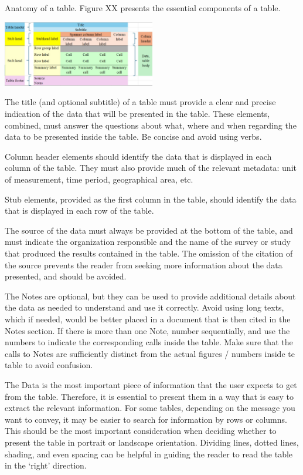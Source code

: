 \documentclass[
  12pt,
]{book}
\begin{document}
Anatomy of a table. Figure XX presents the essential components of a table.

\includegraphics[width=0.5\textwidth,height=\textheight]{pics/Table1.jpg}

The title (and optional subtitle) of a table must provide a clear and precise indication of the data that will be presented in the table. These elements, combined, must answer the questions about what, where and when regarding the data to be presented inside the table. Be concise and avoid using verbs.

Column header elements should identify the data that is displayed in each column of the table. They must also provide much of the relevant metadata: unit of measurement, time period, geographical area, etc.

Stub elements, provided as the first column in the table, should identify the data that is displayed in each row of the table.

The source of the data must always be provided at the bottom of the table, and must indicate the organization responsible and the name of the survey or study that produced the results contained in the table. The omission of the citation of the source prevents the reader from seeking more information about the data presented, and should be avoided.

The Notes are optional, but they can be used to provide additional details about the data as needed to understand and use it correctly. Avoid using long texts, which if needed, would be better placed in a document that is then cited in the Notes section. If there is more than one Note, number sequentially, and use the numbers to indicate the corresponding calls inside the table. Make sure that the calls to Notes are sufficiently distinct from the actual figures / numbers inside te table to avoid confusion.

The Data is the most important piece of information that the user expects to get from the table. Therefore, it is essential to present them in a way that is easy to extract the relevant information. For some tables, depending on the message you want to convey, it may be easier to search for information by rows or columns. This should be the most important consideration when deciding whether to present the table in portrait or landscape orientation. Dividing lines, dotted lines, shading, and even spacing can be helpful in guiding the reader to read the table in the `right' direction.
\end{document}
